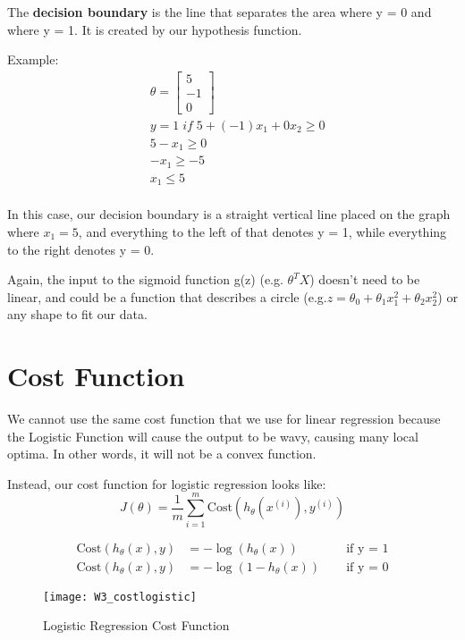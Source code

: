 The {\bf decision boundary} is the line that separates the area where y = 0 and where y = 1. It is created by our hypothesis function.

Example:
\begin{align*}
& \theta = 
\begin{bmatrix}
5 \\ 
-1 \\ 
0
\end{bmatrix} \\ 
& y = 1 \; if \; 5 + (-1) x_1 + 0 x_2 \geq 0 \\ 
& 5 - x_1 \geq 0 \\ 
& - x_1 \geq -5 \\
& x_1 \leq 5 \\ 
\end{align*}

In this case, our decision boundary is a straight vertical line placed on the graph where $x_1 = 5$, and everything to the left of that denotes y = 1, while everything to the right denotes y = 0.

Again, the input to the sigmoid function g(z) (e.g. $\theta^T X$) doesn't need to be linear, and could be a function that describes a circle (e.g.$ z = \theta_0 + \theta_1 x_1^2 +\theta_2 x_2^2$) or any shape to fit our data.

\section{Cost Function}
We cannot use the same cost function that we use for linear regression because the Logistic Function will cause the output to be wavy, causing many local optima. In other words, it will not be a convex function.

Instead, our cost function for logistic regression looks like:
\begin{equation}
J(\theta) = \dfrac{1}{m} \sum_{i=1}^m \mathrm{Cost}(h_\theta(x^{(i)}),y^{(i)})
\end{equation}

\begin{align*}
\mathrm{Cost}(h_\theta(x),y) &= -\log(h_\theta(x)) \; \quad& \text{if y = 1} \\ 
\mathrm{Cost}(h_\theta(x),y) &= -\log(1-h_\theta(x)) \; \quad& \text{if y = 0}
\end{align*}

\begin{figure}[ht]
\center
\texttt{[image: W3\_costlogistic]}
\caption{Logistic Regression Cost Function}
\label{fig:W3_cost}
\end{figure}

